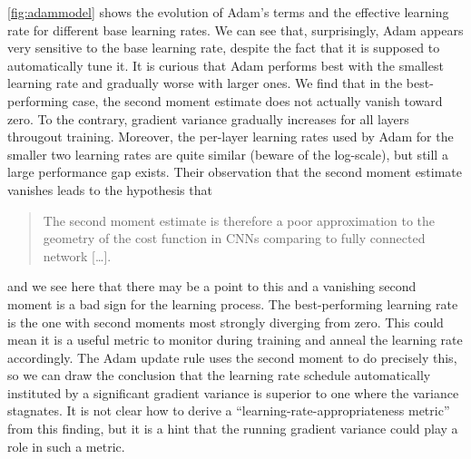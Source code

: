 \cref{fig:adammodel} shows the evolution of Adam's terms and the effective
learning rate for different base learning rates. We can see that, surprisingly,
Adam appears very sensitive to the base learning rate, despite the fact that it
is supposed to automatically tune it. It is curious that Adam performs best with
the smallest learning rate and gradually worse with larger ones. We find that in
the best-performing case, the second moment estimate does not actually vanish
toward zero. To the contrary, gradient variance gradually increases for all
layers througout training. Moreover, the per-layer learning rates used by Adam
for the smaller two learning rates are quite similar (beware of the log-scale), but still a large
performance gap exists. Their observation that the second moment estimate
vanishes leads \citeauthor{kingma2014adam} to the hypothesis that
\begin{quote}
     The second moment estimate is therefore a poor
     approximation to the geometry of the cost function in CNNs comparing to
     fully connected network [\ldots].
\end{quote}
and we see here that there may be a point to this and a vanishing second moment
is a bad sign for the learning process. The best-performing learning rate is the
one with second moments most strongly diverging from zero. This could mean it is
a useful metric to monitor during training and anneal the learning rate
accordingly. The Adam update rule uses the second moment to do precisely this,
so we can draw the conclusion that the learning rate schedule automatically
instituted by a significant gradient variance is superior to one where the
variance stagnates. It is not clear how to derive a
``learning-rate-appropriateness metric'' from this finding, but it is a hint
that the running gradient variance could play a role in such a metric.

